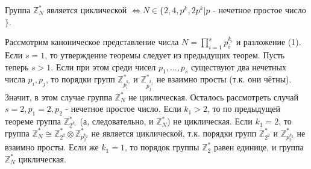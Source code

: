 \begin{proofs}
	Группа $\mathbb{Z}_{N}^{*}$ является циклической $\Leftrightarrow N \in  \{2,4,p^{k}, 2p^{k}|p$ - нечетное простое число$\}$.
	\begin{dokvo}
		Рассмотрим каноническое представление числа $N = \prod_{i=1}^{s}p_{i}^{k_{i}}$ и разложение (1). Если $s = 1$, то утверждение теоремы следует из предыдущих теорем.
		Пусть теперь $s>1$. Если при этом среди чисел $p_{1},\dots,p_{s}$ существуют два нечетных числа $p_{i}, p_{j}$, то порядки групп $\mathbb{Z}_{p^{k_{i}}_{i}}^{*}$ и $\mathbb{Z}_{p^{k_{j}}_{j}}^{*}$ не взаимно просты (т.к. они чётны). Значит, в этом случае группа $\mathbb{Z}_{N}^{*}$ не циклическая.
		Осталось рассмотреть случай $s=2, p_{1}=2, p_{2}$ - нечетное простое число. Если $k_{1}>2$, то по предыдущей теореме группа $\mathbb{Z}_{2^{k_{1}}}^{*}$ (а, следовательно, и $\mathbb{Z}_{N}^{*}$) не циклическая.
		Если $k_{1}=2$, то группа $\mathbb{Z}_{N}^{*} \cong \mathbb{Z}_{2^{2}}^{*} \otimes \mathbb{Z}_{p_{2}^{k_{2}}}^{*}$ не является циклической, т.к. порядки групп $\mathbb{Z}_{2^{2}}^{*}$ и $\mathbb{Z}_{p_{2}^{k_{2}}}^{*}$ не взаимно просты. Если же $k_{1} = 1$, то порядок группы $\mathbb{Z}_{2}^{*}$ равен единице, и группа $\mathbb{Z}_{N}^{*}$ циклическая.
	\end{dokvo}
\end{proofs}
\newpage
